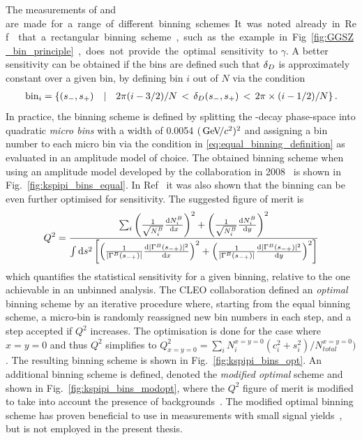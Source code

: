 The measurements of \ci and \si are made for a range of different binning schemes. It was noted already in Ref.~\cite{bondarUseQuantumcorrelatedD02008} that a rectangular binning scheme, such as the example in Fig.~\ref{fig:GGSZ_bin_principle}, does not provide the optimal sensitivity to $\gamma$. A better sensitivity can be obtained if the bins are defined such that $\delta_{D}$ is approximately constant over a given bin, by defining bin $i$ out of $N$ via the condition
\begin{align} \label{eq:equal_binning_definition}
    \text{bin}_i = \left\{ (s_-, s_+)\quad  | \quad 2\pi (i-3/2)/N \,<\, \delta_D(s_-, s_+) \,<\, 2\pi \times (i-1/2)/N  \right\}.
\end{align}
In practice, the binning scheme is defined by splitting the \D-decay phase-space into quadratic \emph{micro bins} with a width of 0.0054 $(\text{\,Ge\kern -0.1em V\!/}c^2)^2$ and assigning a bin number to each micro bin via the condition in \eqref{eq:equal_binning_definition} as evaluated in an amplitude model of choice. The obtained binning scheme when using an amplitude model developed by the \babar collaboration in 2008~\cite{BABAR2008} is shown in Fig.~\ref{fig:kspipi_bins_equal}. In Ref~\cite{bondarUseQuantumcorrelatedD02008} it was also shown that the binning can be even further optimised for sensitivity. The suggested figure of merit is
\begin{align}
    Q^2 = \frac
    {\sum_i \left(\frac{1}{\sqrt{N_i^{{B}}} }\frac{\text d N_i^{{B}}}{\text d x} \right)^2 + \left(\frac{1}{\sqrt{N_i^{{B}}}} \frac{\text d N_i ^{{B}}}{\text d y} \right)^2}
    {\int \text d s^2 \left[\left(\frac{1}{|\Gamma^{{B}}(s_{-+})|}\frac{ \text d |\Gamma^{{B}}(s_{-+})|^2 }{ \text d x}\right)^2 + \left(\frac{1}{|\Gamma^{{B}}(s_{-+})|}\frac{ \text d |\Gamma^{{B}}(s_{-+})|^2 }{ \text d y}\right)^2 \right]}
\end{align}
which quantifies the statistical sensitivity for a given binning, relative to the one achievable in an unbinned analysis. The CLEO collaboration defined an \emph{optimal} binning scheme by an iterative procedure where, starting from the equal binning scheme, a micro-bin is randomly reassigned new bin numbers in each step, and a step accepted if $Q^2$ increases. The optimisation is done for the case where $x=y=0$ and thus $Q^2$ simplifies to $Q^2_{x=y=0}=\sum_i N_i^{x=y=0}(c_i^2+s_i^2)/N_{total}^{x=y=0})$. The resulting binning scheme is shown in Fig.~\ref{fig:kspipi_bins_opt}. An additional binning scheme is defined, denoted the \emph{modified optimal} scheme and shown in Fig.~\ref{fig:kspipi_bins_modopt}, where the $Q^2$ figure of merit is modified to take into account the presence of backgrounds~\cite{CLEOCISI}. The modified optimal binning scheme has proven beneficial to use in measurements with small signal yields~\cite{}, but is not employed in the present thesis. 

